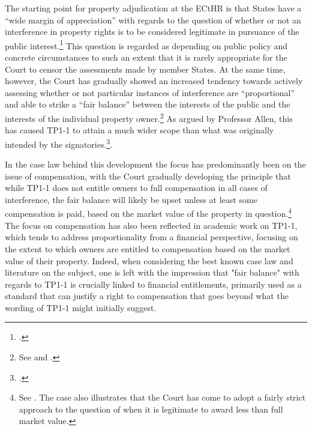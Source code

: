 The starting point for property adjudication at the ECtHR is that States have a ``wide margin of appreciation'' with regards to the question of whether or not an interference in property rights is to be considered legitimate in pursuance of the public interest.\footcite[See][54]{james86} This question is regarded as depending on public policy and concrete circumstances to such an extent that it is rarely appropriate for the Court to censor the assessments made by member States. At the same time, however, the Court has gradually showed an increased tendency towards actively assessing whether or not particular instances of interference are ``proportional'' and able to strike a ``fair balance'' between the interests of the public and the interests of the individual property owner.\footnote{See \cite[69]{sporrong82} and \cite[120]{james86}.}  As argued by Professor Allen, this has caused TP1-1 to attain a much wider scope than what was originally intended by the signatories.\footcite[1055]{allen10}.

In the case law behind this development the focus has predominantly been on the issue of compensation, with the Court gradually developing the principle that while TP1-1 does not entitle owners to full compensation in all cases of interference, the fair balance will likely be upset unless at least some compensation is paid, based on the market value of the property in question.\footnote{See \cite[103]{scordino06}. The case also illustrates that the Court has come to adopt a fairly strict approach to the question of when it is legitimate to award less than full market value.} The focus on compensation has also been reflected in academic work on TP1-1, which tends to address proportionality from a financial perspective, focusing on the extent to which owners are entitled to compensation based on the market value of their property. Indeed, when considering the best known case law and literature on the subject, one is left with the impression that "fair balance" with regards to TP1-1 is crucially linked to financial entitlements, primarily used as a standard that can justify a right to compensation that goes beyond what the wording of TP1-1 might initially suggest.

